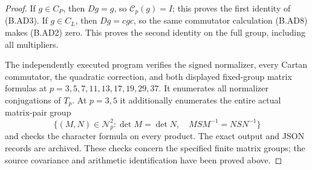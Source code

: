 \begin{proof}
If $g\in C_P$, then $Dg=g$, so $\mathscr C_p(g)=I$;
this proves the first identity of (B.AD3).
If $g\in C_L$, then $Dg=cgc$, so the same commutator
calculation (B.AD8) makes (B.AD2) zero.
This proves the second identity on the full group,
including all multipliers.

The independently executed program
 verifies the
signed normalizer, every Cartan commutator, the
quadratic correction, and both displayed fixed-group
matrix formulas at
$p=3,5,7,11,13,17,19,29,37$.
It enumerates all normalizer conjugations of $T_p$.
At $p=3,5$ it additionally enumerates the entire
actual matrix-pair group
\[
 \{(M,N)\in\mathscr N_p^2:
       \det M=\det N,\quad
       MSM^{-1}=NSN^{-1}\}
                                                               \tag{B.AD9}
\]
and checks the character formula on every product.
The exact output and JSON records are archived.
These checks concern the specified finite matrix
groups; the source covariance and arithmetic
identification have been proved above.
\end{proof}
